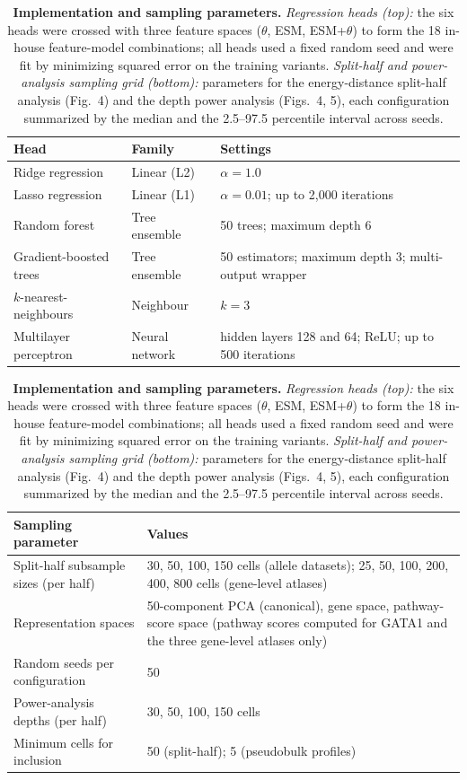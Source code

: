\documentclass[11pt,letterpaper]{article}
\begin{document}
\begin{table}[H]
\centering
\caption{\textbf{Implementation and sampling parameters.} \emph{Regression heads (top):} the six heads were crossed with three feature spaces ($\theta$, ESM, ESM+$\theta$) to form the 18 in-house feature-model combinations; all heads used a fixed random seed and were fit by minimizing squared error on the training variants. \emph{Split-half and power-analysis sampling grid (bottom):} parameters for the energy-distance split-half analysis (Fig.~4) and the depth power analysis (Figs.~4, 5), each configuration summarized by the median and the 2.5--97.5 percentile interval across seeds.}
\label{stab:heads}
\small
\begin{tabular}{@{}p{4.4cm} p{3.0cm} p{8.3cm}@{}}
\toprule
Head & Family & Settings \\
\midrule
Ridge regression & Linear (L2) & $\alpha = 1.0$ \\
Lasso regression & Linear (L1) & $\alpha = 0.01$; up to 2{,}000 iterations \\
Random forest & Tree ensemble & 50 trees; maximum depth 6 \\
Gradient-boosted trees & Tree ensemble & 50 estimators; maximum depth 3; multi-output wrapper \\
$k$-nearest-neighbours & Neighbour & $k = 3$ \\
Multilayer perceptron & Neural network & hidden layers 128 and 64; ReLU; up to 500 iterations \\
\bottomrule
\end{tabular}

\smallskip
\begin{tabular}{@{}p{5.4cm} p{10.7cm}@{}}
\toprule
Sampling parameter & Values \\
\midrule
Split-half subsample sizes (per half) & 30, 50, 100, 150 cells (allele datasets); 25, 50, 100, 200, 400, 800 cells (gene-level atlases) \\
Representation spaces & 50-component PCA (canonical), gene space, pathway-score space (pathway scores computed for GATA1 and the three gene-level atlases only) \\
Random seeds per configuration & 50 \\
Power-analysis depths (per half) & 30, 50, 100, 150 cells \\
Minimum cells for inclusion & 50 (split-half); 5 (pseudobulk profiles) \\
\bottomrule
\end{tabular}
\end{table}
\end{document}
